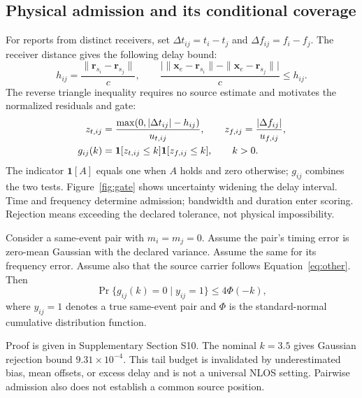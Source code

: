 \subsection{Physical admission and its conditional coverage}
For reports from distinct receivers, set $\Delta t_{ij}=t_i-t_j$ and $\Delta f_{ij}=f_i-f_j$. The receiver distance gives the following delay bound:
\begin{equation}
 h_{ij}=\frac{\|\mathbf r_{s_i}-\mathbf r_{s_j}\|}{c},\qquad
 \frac{\big|\|\mathbf x_e-\mathbf r_{s_i}\|-\|\mathbf x_e-\mathbf r_{s_j}\|\big|}{c}\leq h_{ij}.\label{eq:geometry}
\end{equation}
The reverse triangle inequality requires no source estimate and motivates the normalized residuals and gate:
\begin{align}
 z_{t,ij}&=\frac{\max(0,|\Delta t_{ij}|-h_{ij})}{u_{t,ij}},\qquad
 z_{f,ij}=\frac{|\Delta f_{ij}|}{u_{f,ij}},\label{eq:residuals}\\
 g_{ij}(k)&=\mathbf{1}[z_{t,ij}\leq k]\mathbf{1}[z_{f,ij}\leq k],\qquad k>0.\label{eq:gate}
\end{align}
The indicator $\mathbf{1}[A]$ equals one when $A$ holds and zero otherwise; $g_{ij}$ combines the two tests. Figure~\ref{fig:gate} shows uncertainty widening the delay interval. Time and frequency determine admission; bandwidth and duration enter scoring. Rejection means exceeding the declared tolerance, not physical impossibility.


\begin{Proposition}\label{prop:gate}
Consider a same-event pair with $m_i=m_j=0$. Assume the pair's timing error is zero-mean Gaussian with the declared variance. Assume the same for its frequency error. Assume also that the source carrier follows Equation~\eqref{eq:other}. Then
\begin{equation}
 \Pr\{g_{ij}(k)=0\mid y_{ij}=1\}\leq4\Phi(-k),\label{eq:bound}
\end{equation}
where $y_{ij}=1$ denotes a true same-event pair and $\Phi$ is the standard-normal cumulative distribution function.
\end{Proposition}
Proof is given in Supplementary Section S10.
The nominal $k=3.5$ gives Gaussian rejection bound $9.31\times10^{-4}$. This tail budget is invalidated by underestimated bias, mean offsets, or excess delay and is not a universal NLOS setting. Pairwise admission also does not establish a common source position.

